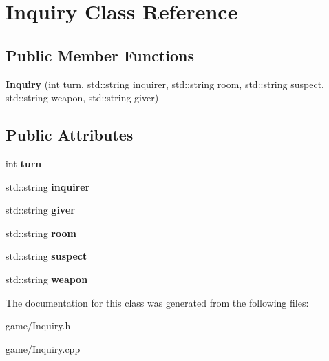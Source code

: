 \hypertarget{classInquiry}{}\section{Inquiry Class Reference}
\label{classInquiry}
\subsection*{Public Member Functions}
\begin{DoxyCompactItemize}
\item 
\mbox{\label{classInquiry_ae4001d759383bd9c5220ee8ea4e3f5d1}} 
{\bfseries Inquiry} (int turn, std\+::string inquirer, std\+::string room, std\+::string suspect, std\+::string weapon, std\+::string giver)
\end{DoxyCompactItemize}
\subsection*{Public Attributes}
\begin{DoxyCompactItemize}
\item 
\mbox{\label{classInquiry_ad8cd9223fe302565184aa7737bda9472}} 
int {\bfseries turn}
\item 
\mbox{\label{classInquiry_a8eb1063b395f7cab0979e146093cb650}} 
std\+::string {\bfseries inquirer}
\item 
\mbox{\label{classInquiry_ace3d8a33144bf20b9b7c07921868af38}} 
std\+::string {\bfseries giver}
\item 
\mbox{\label{classInquiry_a8ed4b7a6b7c7a030eb137e1eea8c5697}} 
std\+::string {\bfseries room}
\item 
\mbox{\label{classInquiry_ad6d0ea284f6b62e5a4119e93cd77749b}} 
std\+::string {\bfseries suspect}
\item 
\mbox{\label{classInquiry_ac34775cd7cc0f05f210158d2ce33fa98}} 
std\+::string {\bfseries weapon}
\end{DoxyCompactItemize}


The documentation for this class was generated from the following files\+:\begin{DoxyCompactItemize}
\item 
game/Inquiry.\+h\item 
game/Inquiry.\+cpp\end{DoxyCompactItemize}
